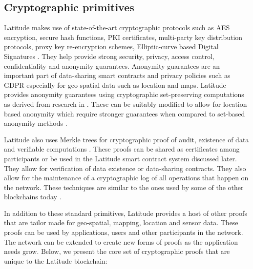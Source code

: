 \subsection{Cryptographic primitives} \label{sec:crypto} Latitude makes use of state-of-the-art cryptographic protocols
such as AES encryption, secure hash functions, PKI certificates, multi-party key distribution protocols, proxy key
re-encryption schemes, Elliptic-curve based Digital Signatures \cite{ecdsa}. They help provide strong security, privacy,
access control, confidentiality and anonymity guarantees. Anonymity guarantees are an important part of data-sharing
smart contracts and privacy policies such as GDPR \cite{gdpr} especially for geo-spatial data such as location and maps.
Latitude provides anonymity guarantees using cryptographic set-preserving computations as derived from research in
\cite{kissner_set}. These can be suitably modified to allow for location-based anonymity which require stronger
guarantees when compared to set-based anonymity methods \cite{divanis_kanon,xu_loc_anon}.

Latitude also uses Merkle trees for cryptographic proof of audit, existence of data and verifiable computations
\cite{becker2008}. These proofs can be shared as certificates among participants or be used in the Latitude smart
contract system discussed later. They allow for verification of data existence or data-sharing contracts. They also
allow for the maintenance of a cryptographic log of all operations that happen on the network. These techniques are
similar to the ones used by some of the other blockchains today \cite{buterin_merkle}.


%


In addition to these standard primitives, Latitude provides a host of other proofs that are tailor made
for geo-spatial, mapping, location and sensor data. These proofs can be used by applications, users and
other participants in the network. The network can be extended to create new forms of proofs as the application needs
grow. Below, we present the core set of cryptographic proofs that are unique to the Latitude blockchain:

